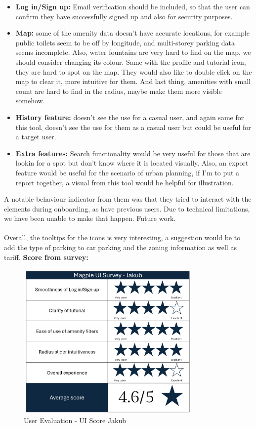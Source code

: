 \begin{itemize}
    \item \textbf{Log in/Sign up: }Email verification should be included, so that the user can confirm they have successfully signed up and also for security purposes.
    \item \textbf{Map: }some of the amenity data doesn't have accurate locations, for example public toilets seem to be off by longitude, and multi-storey parking data seems incomplete. Also, water fountains are very hard to find on the map, we should consider changing its colour. Same with the profile and tutorial icon, they are hard to spot on the map. They would also like to double click on the map to clear it, more intuitive for them. And last thing, amenities with small count are hard to find in the radius, maybe make them more visible somehow.
    \item \textbf{History feature: }doesn't see the use for a casual user, and again same for this tool, doesn't see the use for them as a casual user but could be useful for a target user.
    \item \textbf{Extra features: }Search functionality would be very useful for those that are lookin for a spot but don't know where it is located visually. Also, an export feature would be useful for the scenario of urban planning, if I'm to put a report together, a visual from this tool would be helpful for illustration.
\end{itemize}
A notable behaviour indicator from them was that they tried to interact with the elements during onboarding, as have previous users. Due to technical limitations, we have been unable to make that happen. Future work.\\\\
Overall, the tooltips for the icons is very interesting, a suggestion would be to add the type of parking to car parking and the zoning information as well as tariff.
\textbf{Score from survey: }
\begin{figure}
    \centering
    \includegraphics[width=0.8\textwidth]{images/survey-jakub.png}
    \caption{User Evaluation - UI Score Jakub}
\end{figure}

